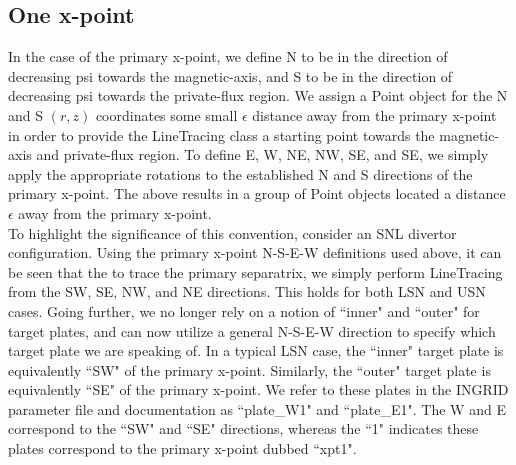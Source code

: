 \subsection{\label{sec:level2}One x-point}
In the case of the primary x-point, we define N to be in the direction of decreasing psi towards the magnetic-axis, and S to be in the direction of decreasing psi towards the private-flux region. We assign a Point object for the N and S $(r,z)$ coordinates some small $\epsilon$ distance away from the primary x-point in order to provide the LineTracing class a starting point towards the magnetic-axis and private-flux region. To define E, W, NE, NW, SE, and SE, we simply apply the appropriate rotations to the established N and S directions of the primary x-point. The above results in a group of Point objects located a distance $\epsilon$ away from the primary x-point.\\ \indent
To highlight the significance of this convention, consider an SNL divertor configuration. Using the primary x-point N-S-E-W definitions used above, it can be seen that the to trace the primary separatrix, we simply perform LineTracing from the SW, SE, NW, and NE directions. This holds for both LSN and USN cases. Going further, we no longer rely on a notion of ``inner" and ``outer" for target plates, and can now utilize a general N-S-E-W direction to specify which target plate we are speaking of. In a typical LSN case, the ``inner" target plate is equivalently ``SW" of the primary x-point. Similarly, the ``outer" target plate is equivalently ``SE" of the primary x-point. We refer to these plates in the INGRID parameter file and documentation as ``plate\_W1" and ``plate\_E1". The W and E correspond to the ``SW" and ``SE" directions, whereas the ``1" indicates these plates correspond to the primary x-point dubbed ``xpt1".
